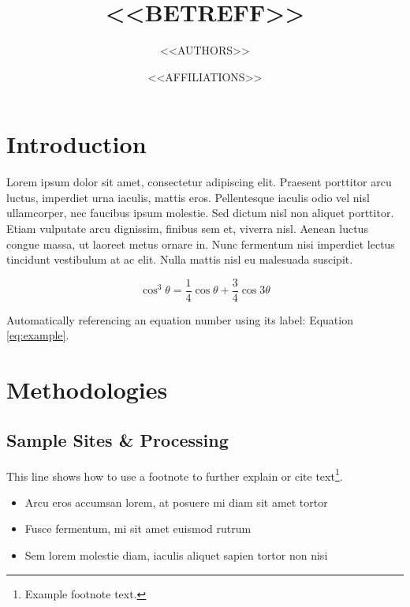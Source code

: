 \documentclass[
	a4paper,
	10pt,
	twoside,
]{customarticle}
\title{<<BETREFF>>} %
\author{%
	<<AUTHORS>>
}
\date{
	\footnotesize <<AFFILIATIONS>>
}
\begin{document}
\maketitle %

\newpage


\section{Introduction}

Lorem ipsum dolor sit amet, consectetur adipiscing elit. Praesent porttitor arcu luctus, imperdiet urna iaculis, mattis eros. Pellentesque iaculis odio vel nisl ullamcorper, nec faucibus ipsum molestie. Sed dictum nisl non aliquet porttitor. Etiam vulputate arcu dignissim, finibus sem et, viverra nisl. Aenean luctus congue massa, ut laoreet metus ornare in. Nunc fermentum nisi imperdiet lectus tincidunt vestibulum at ac elit. Nulla mattis nisl eu malesuada suscipit.

\begin{equation}
	\cos^3 \theta =\frac{1}{4}\cos\theta+\frac{3}{4}\cos 3\theta
	\label{eq:example}
\end{equation}

Automatically referencing an equation number using its label: Equation \ref{eq:example}.

\section{Methodologies}

\subsection{Sample Sites \& Processing}

This line shows how to use a footnote to further explain or cite text\footnote{Example footnote text.}.

\begin{itemize}
	\item Arcu eros accumsan lorem, at posuere mi diam sit amet tortor
	\item Fusce fermentum, mi sit amet euismod rutrum
	\item Sem lorem molestie diam, iaculis aliquet sapien tortor non nisi
\end{itemize}
\end{document}
